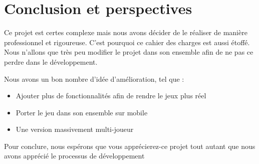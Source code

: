 \chapter*{Conclusion et perspectives}
\label{sec:conclusion}

    Ce projet est certes complexe mais nous avons décider de le réaliser de manière professionnel et rigoureuse. C'est pourquoi ce cahier des charges est aussi étoffé. Nous n'allons que très peu modifier le projet dans son ensemble afin de ne pas ce perdre dans le développement.
    
    Nous avons un bon nombre d'idée d'amélioration, tel que :
    \begin{itemize}
        \item Ajouter plus de fonctionnalités afin de rendre le jeux plus réel
        \item Porter le jeu dans son ensemble sur mobile
        \item Une version massivement multi-joueur
    \end{itemize}
    
    Pour conclure, nous espérons que vous apprécierez-ce projet tout autant que nous avons apprécié le processus de développement
    

